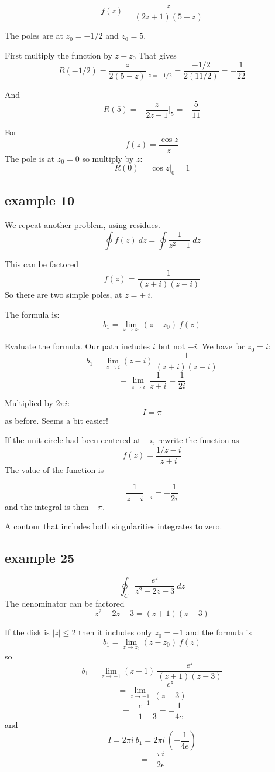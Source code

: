 \documentclass[11pt, oneside]{article}
\begin{document}
\label{sec:ex13R}

\[ f(z) = \frac{z}{(2z + 1)(5 - z)} \]

The poles are at $z_0 = -1/2$ and $z_0 = 5$.

First multiply the function by $z - z_0$  That gives
\[  R(-1/2) = \frac{z}{2 (5 - z)} \bigg |_{z = -1/2}  = \frac{-1/2}{2(11/2)} = -\frac{1}{22} \]

And
\[ R(5) = -\frac{z}{2z + 1} \bigg |_5 = - \frac{5}{11} \]

For
\[ f(z) = \frac{\cos z}{z} \]
The pole is at $z_0 = 0$ so multiply by $z$:
\[ R(0) = \cos z \bigg |_0 = 1 \]

\subsection*{example 10}

\label{sec:ex10R}

We repeat another problem, using residues.  
\[ \oint f(z) \ dz = \oint \frac{1}{z^2 + 1} \ dz \]

This can be factored
\[ f(z) = \frac{1}{(z + i)(z - i)} \]
So there are two simple poles, at $z = \pm \ i$.

The formula is:
\[ b_1 = \lim_{z \rightarrow z_0} (z-z_0) \ f(z)  \]

Evaluate the formula.  Our path includes $i$ but not $-i$.  We have for $z_0 = i$:
\[ b_1 = \lim_{z \rightarrow i} (z-i) \  \frac{1}{(z+i)(z-i)} \]
\[ = \lim_{z \rightarrow i}  \  \frac{1}{z+i} = \frac{1}{2i} \]

Multiplied by $2 \pi i$:
\[ I = \pi \]
as before.  Seems a bit easier!

If the unit circle had been centered at $-i$, rewrite the function as
\[ f(z) = \frac{1/z-i}{z+i} \]
The value of the function is

\[ \frac{1}{z-i} \bigg |_{-i} = -\frac{1}{2i} \]
and the integral is then $- \pi$.

A contour that includes both singularities integrates to zero.

\subsection*{example 25}

\label{sec:ex25R}

\[ \oint_C \frac{e^z}{z^2 - 2z - 3} \ dz \]
The denominator can be factored
\[ z^2 - 2z - 3 = (z + 1)(z - 3) \]

If the disk is $|z| \le 2$ then it includes only $z_0 = -1$ and the formula is
\[ b_1 = \lim_{z \rightarrow z_0} (z-z_0) \ f(z)  \]
so
\[ b_1 = \lim_{z \rightarrow -1} (z+1) \ \frac{e^z}{(z + 1)(z - 3)}  \]
\[ = \lim_{z \rightarrow -1} \ \frac{e^z}{(z - 3)}  \]
\[ = \frac{e^{-1}}{-1 - 3} = - \frac{1}{4 e} \]
and
\[ I = 2 \pi i \ b_1 = 2 \pi i \ (- \frac{1}{4 e}) \]
\[ = - \frac{\pi i}{2 e} \]
\end{document}
